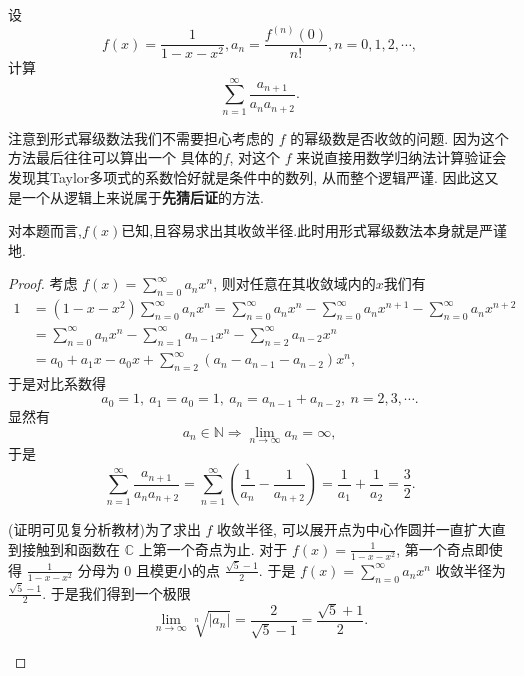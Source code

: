 \documentclass[../../main.tex]{subfiles}%
\begin{document}
\begin{example}
设
\[
f(x)=\frac{1}{1 - x - x^2}, a_n=\frac{f^{(n)}(0)}{n!}, n = 0,1,2,\cdots,
\]
计算
\[
\sum_{n = 1}^{\infty}\frac{a_{n + 1}}{a_n a_{n + 2}}.
\]
\end{example}
\begin{note}
注意到形式幂级数法我们不需要担心考虑的 \( f \) 的幂级数是否收敛的问题. 因为这个方法最后往往可以算出一个 具体的\( f \), 对这个 \( f \) 来说直接用数学归纳法计算验证会发现其Taylor多项式的系数恰好就是条件中的数列, 从而整个逻辑严谨. 因此这又是一个从逻辑上来说属于\textbf{先猜后证}的方法.

对本题而言,$f(x)$已知,且容易求出其收敛半径.此时用形式幂级数法本身就是严谨地.
\end{note}
\begin{proof}

考虑 \( f(x)=\sum_{n = 0}^{\infty}a_n x^n \), 则对任意在其收敛域内的$x$我们有
\begin{align}
1&=(1 - x - x^2)\sum_{n = 0}^{\infty}a_n x^n=\sum_{n = 0}^{\infty}a_n x^n-\sum_{n = 0}^{\infty}a_n x^{n + 1}-\sum_{n = 0}^{\infty}a_n x^{n + 2}\nonumber \\
&=\sum_{n = 0}^{\infty}a_n x^n-\sum_{n = 1}^{\infty}a_{n - 1}x^n-\sum_{n = 2}^{\infty}a_{n - 2}x^n\nonumber \\
&=a_0 + a_1 x - a_0 x + \sum_{n = 2}^{\infty}(a_n - a_{n - 1} - a_{n - 2})x^n,\nonumber
\end{align}
于是对比系数得
\[
a_0 = 1,\ a_1 = a_0 = 1,\ a_n = a_{n - 1} + a_{n - 2},\ n = 2,3,\cdots. 
\]
显然有
\[
a_n\in\mathbb{N}\Rightarrow\lim_{n\rightarrow\infty}a_n=\infty,
\]
于是
\[
\sum_{n = 1}^{\infty}\frac{a_{n + 1}}{a_n a_{n + 2}}=\sum_{n = 1}^{\infty}\left(\frac{1}{a_n}-\frac{1}{a_{n + 2}}\right)=\frac{1}{a_1}+\frac{1}{a_2}=\frac{3}{2}.
\]
\begin{remark}
(证明可见复分析教材)为了求出 \( f \) 收敛半径, 可以展开点为中心作圆并一直扩大直到接触到和函数在 \( \mathbb{C} \) 上第一个奇点为止. 对于 \( f(x)=\frac{1}{1 - x - x^2} \), 第一个奇点即使得 \( \frac{1}{1 - x - x^2} \) 分母为 0 且模更小的点 \( \frac{\sqrt{5}-1}{2} \). 于是 \( f(x)=\sum_{n = 0}^{\infty}a_n x^n \) 收敛半径为 \( \frac{\sqrt{5}-1}{2} \). 于是我们得到一个极限
\[
\lim_{n\rightarrow\infty}\sqrt[n]{|a_n|}=\frac{2}{\sqrt{5}-1}=\frac{\sqrt{5}+1}{2}.
\]
\end{remark}

\end{proof}
\end{document}
